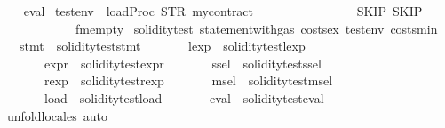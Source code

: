 \begin{isabellebody}
%
\isadelimproof
\ \ %
\endisadelimproof
%
\isatagproof
{}\isamarkupfalse%
\ {\isacharparenleft}{\kern0pt}eval{\isacharparenright}{\kern0pt}%
\endisatagproof
{\isafoldproof}%
%
\isadelimproof
\isanewline
%
\endisadelimproof
\isanewline
{}\isamarkupfalse%
\ {\isachardoublequoteopen}testenv{}\ {\isasymequiv}\ loadProc\ {\isacharparenleft}{\kern0pt}STR\ {\isacharprime}{\kern0pt}{\isacharprime}{\kern0pt}mycontract{\isacharprime}{\kern0pt}{\isacharprime}{\kern0pt}{\isacharparenright}{\kern0pt}\isanewline
\ \ \ \ \ \ \ \ \ \ \ \ \ \ {\isacharparenleft}{\kern0pt}{\isacharbrackleft}{\kern0pt}{\isacharbrackright}{\kern0pt}{\isacharcomma}{\kern0pt}\ {\isacharparenleft}{\kern0pt}{\isacharbrackleft}{\kern0pt}{\isacharbrackright}{\kern0pt}{\isacharcomma}{\kern0pt}\ SKIP{\isacharparenright}{\kern0pt}{\isacharcomma}{\kern0pt}\ SKIP{\isacharparenright}{\kern0pt}\isanewline
\ \ \ \ \ \ \ \ \ \ \ \ fmempty{\isachardoublequoteclose}\isanewline
\isanewline
{}\isamarkupfalse%
\ soliditytest{}{\isacharcolon}{\kern0pt}\ statement{\isacharunderscore}{\kern0pt}with{\isacharunderscore}{\kern0pt}gas\ costs{\isacharunderscore}{\kern0pt}ex\ testenv{}\ costs{\isacharunderscore}{\kern0pt}min\isanewline
\ \ \ stmt{}\ {\isacharequal}{\kern0pt}\ {\isachardoublequoteopen}soliditytest{}{\isachardot}{\kern0pt}stmt{\isachardoublequoteclose}\isanewline
\ \ \ \ \ \ \ lexp{}\ {\isacharequal}{\kern0pt}\ soliditytest{}{\isachardot}{\kern0pt}lexp\ \isanewline
\ \ \ \ \ \ \ expr{}\ {\isacharequal}{\kern0pt}\ soliditytest{}{\isachardot}{\kern0pt}expr\isanewline
\ \ \ \ \ \ \ ssel{}\ {\isacharequal}{\kern0pt}\ soliditytest{}{\isachardot}{\kern0pt}ssel\isanewline
\ \ \ \ \ \ \ rexp{}\ {\isacharequal}{\kern0pt}\ soliditytest{}{\isachardot}{\kern0pt}rexp\isanewline
\ \ \ \ \ \ \ msel{}\ {\isacharequal}{\kern0pt}\ soliditytest{}{\isachardot}{\kern0pt}msel\isanewline
\ \ \ \ \ \ \ load{}\ {\isacharequal}{\kern0pt}\ soliditytest{}{\isachardot}{\kern0pt}load\isanewline
\ \ \ \ \ \ \ eval{}\ {\isacharequal}{\kern0pt}\ soliditytest{}{\isachardot}{\kern0pt}eval\isanewline
%
\isadelimproof
\ \ %
\endisadelimproof
%
\isatagproof
{}\isamarkupfalse%
\ unfold{\isacharunderscore}{\kern0pt}locales\ auto%

\end{isabellebody}
